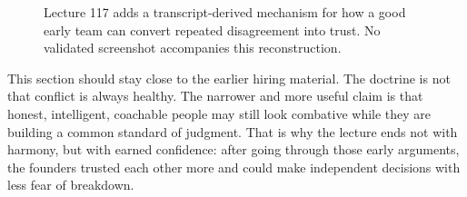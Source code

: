 \documentclass[11pt,oneside]{book}
\begin{document}
\begin{figure}
\centering
{}
\caption{Lecture 117 adds a transcript-derived mechanism for how a good early team can convert repeated disagreement into trust. No validated screenshot accompanies this reconstruction.}
\end{figure}

This section should stay close to the earlier hiring material. The doctrine is not that conflict is always healthy. The narrower and more useful claim is that honest, intelligent, coachable people may still look combative while they are building a common standard of judgment. That is why the lecture ends not with harmony, but with earned confidence: after going through those early arguments, the founders trusted each other more and could make independent decisions with less fear of breakdown.

\end{document}
